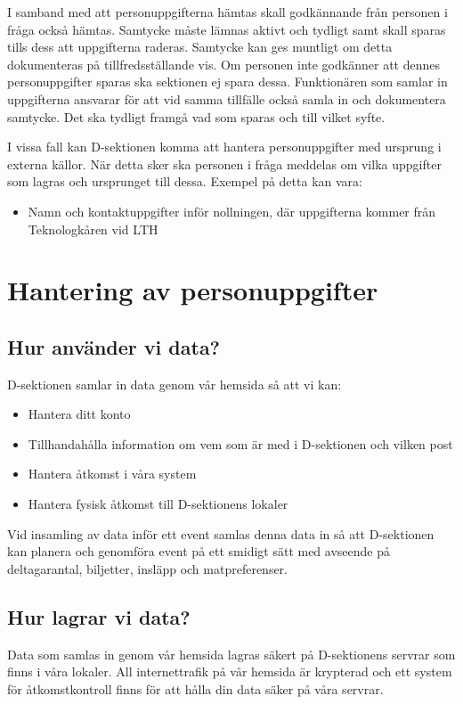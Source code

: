 \documentclass{dsekprotokoll}
\begin{document}
I samband med att personuppgifterna hämtas skall godkännande från personen i fråga också hämtas. Samtycke måste lämnas aktivt och tydligt samt skall sparas tills dess att uppgifterna raderas. Samtycke kan ges muntligt om detta dokumenteras på tillfredsställande vis. Om personen inte godkänner att dennes personuppgifter sparas ska sektionen ej spara dessa. Funktionären som samlar in uppgifterna ansvarar för att vid samma tillfälle också samla
in och dokumentera samtycke. Det ska tydligt framgå vad som sparas och till vilket syfte.

I vissa fall kan D-sektionen komma att hantera personuppgifter med ursprung i externa källor. När detta sker ska personen i fråga meddelas om vilka uppgifter som lagras och ursprunget till dessa. Exempel på detta kan vara:

\begin{itemize}
    \item Namn och kontaktuppgifter inför nollningen, där uppgifterna kommer från Teknologkåren vid LTH
\end{itemize}



\section{Hantering av personuppgifter}
\subsection{Hur använder vi data?}
D-sektionen samlar in data genom vår hemsida så att vi kan:
\begin{itemize}
    \item Hantera ditt konto
    \item Tillhandahålla information om vem som är med i D-sektionen och vilken post
    \item Hantera åtkomst i våra system
    \item Hantera fysisk åtkomst till D-sektionens lokaler
\end{itemize}

Vid insamling av data inför ett event samlas denna data in så att D-sektionen kan planera och genomföra event på ett smidigt sätt med avseende på deltagarantal, biljetter, insläpp och matpreferenser.

\subsection{Hur lagrar vi data?}
Data som samlas in genom vår hemsida lagras säkert på D-sektionens servrar som finns i våra lokaler. All internettrafik på vår hemsida är krypterad och ett system för åtkomstkontroll finns för att hålla din data säker på våra servrar.
\end{document}
